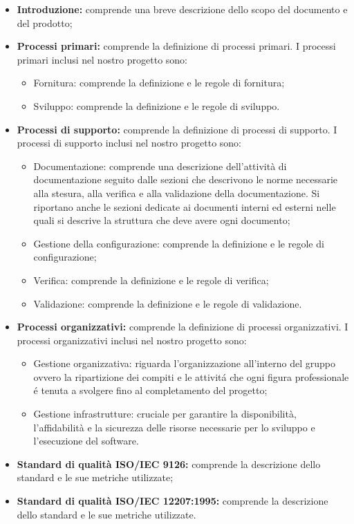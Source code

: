 \begin{itemize}
    \item \textbf{Introduzione:} comprende una breve descrizione dello scopo del documento e del prodotto;
    \item \textbf{Processi primari:} comprende la definizione di processi primari.
    I processi primari inclusi nel nostro progetto sono:
    \begin{itemize}
        \item Fornitura: comprende la definizione e le regole di fornitura;
        \item Sviluppo: comprende la definizione e le regole di sviluppo.
    \end{itemize}
    \item \textbf{Processi di supporto:} comprende la definizione di processi di supporto.
    I processi di supporto inclusi nel nostro progetto sono:
    \begin{itemize}
        \item Documentazione: comprende una descrizione dell'attività di documentazione seguito dalle sezioni che descrivono le norme necessarie alla stesura, alla verifica e 
        alla validazione della documentazione. Si riportano anche le sezioni dedicate ai documenti interni ed esterni nelle quali si descrive la struttura che deve avere ogni documento;
        \item Gestione della configurazione: comprende la definizione e le regole di configurazione; 
        \item Verifica: comprende la definizione e le regole di verifica;
        \item Validazione: comprende la definizione e le regole di validazione.
    \end{itemize}
    \item \textbf{Processi organizzativi:} comprende la definizione di processi organizzativi.
    I processi organizzativi inclusi nel nostro progetto sono:
    \begin{itemize}
        \item Gestione organizzativa: riguarda l'organizzazione all'interno del gruppo ovvero la ripartizione dei compiti e le attivitá che ogni figura professionale é tenuta a svolgere fino al 
        completamento del progetto;
        \item Gestione infrastrutture: cruciale per garantire la disponibilità, l'affidabilità e la sicurezza delle risorse necessarie per lo sviluppo e l'esecuzione del software.
    \end{itemize}
    \item \textbf{Standard di qualità ISO/IEC 9126:} comprende la descrizione dello standard e le sue metriche utilizzate;
    \item \textbf{Standard di qualità ISO/IEC 12207:1995:} comprende la descrizione dello standard e le sue metriche utilizzate.
\end{itemize}

